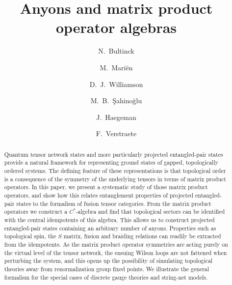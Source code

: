 \documentclass[12 pt]{article}
\title{\textbf{Anyons and matrix product operator algebras}}
\author[a]{N.~Bultinck}
\author[a]{M.~Mari\"en}
\author[b]{D.~J.~Williamson}
\author[b]{M.~B.~Şahinoğlu}
\author[a]{J.~Haegeman}
\author[a,b]{F.~Verstraete}
\affil[a]{\small{\emph{Department of Physics and Astronomy, Ghent University}}}
\affil[b]{\small{\emph{Vienna Center for Quantum Technology, University of Vienna}}}
\begin{document}
\maketitle

\begin{abstract}
    Quantum tensor network states and more particularly projected entangled-pair states provide a natural framework for representing ground states of gapped, topologically ordered systems. The defining feature of these representations is that topological order is a consequence of the symmetry of the underlying tensors in terms of matrix product operators. In this paper, we present a systematic study of those matrix product operators, and show how this relates entanglement properties of projected entangled-pair states to the formalism of fusion tensor categories. From the matrix product operators we construct a $C^*$-algebra and find that topological sectors can be identified with the central idempotents of this algebra. This allows us to construct projected entangled-pair states containing an arbitrary number of anyons. Properties such as topological spin, the $S$ matrix, fusion and braiding relations can readily be extracted from the idempotents. As the matrix product operator symmetries are acting purely on the virtual level of the tensor network, the ensuing Wilson loops are not fattened when perturbing the system, and this opens up the possibility of simulating topological theories away from renormalization group fixed points. We illustrate the general formalism for the special cases of discrete gauge theories and string-net models.

\end{abstract}

\pagebreak
\tableofcontents
\end{document}

